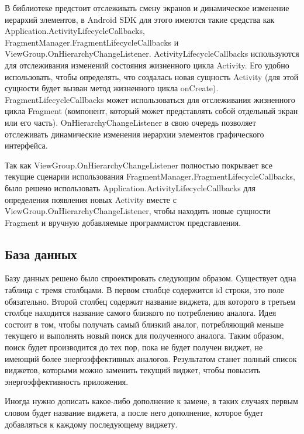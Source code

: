 \documentclass[a4paper,14pt]{extarticle} %
\begin{document}
	В библиотеке предстоит отслеживать смену экранов и динамическое изменение иерархий элементов, в Android SDK для этого имеются такие средства как Application.ActivityLifecycleCallbacks, FragmentManager.FragmentLifecycleCallbacks и ViewGroup.OnHierarchyChangeListener. ActivityLifecycleCallbacks используются для отслеживания изменений состояния жизненного цикла Activity. Его удобно использовать, чтобы определять, что создалась новая сущность Activity (для этой сущности будет вызван метод жизненного цикла onCreate). FragmentLifecycleCallbacks может использоваться для отслеживания жизненного цикла Fragment (компонент, который может представлять собой отдельный экран или его часть). OnHierarchyChangeListener в свою очередь позволяет отслеживать динамические изменения иерархии элементов графического интерфейса.
	
	Так как ViewGroup.OnHierarchyChangeListener полностью покрывает все текущие сценарии использования FragmentManager.FragmentLifecycleCallbacks, было решено использовать Application.ActivityLifecycleCallbacks для определения появления новых Activity вместе с ViewGroup.OnHierarchyChangeListener, чтобы находить новые сущности Fragment и вручную добавляемые программистом представления.
	
	\subsection{База данных}
	
	Базу данных решено было спроектировать следующим образом. Существует одна таблица с тремя столбцами. В первом столбце содержится id строки, это поле обязательно. Второй столбец содержит название виджета, для которого в третьем столбце находится название самого близкого по потреблению аналога. Идея состоит в том, чтобы получать самый близкий аналог, потребляющий меньше текущего и выполнять новый поиск для полученного аналога. Таким образом, поиск будет производится до тех пор, пока не будет получен виджет, не имеющий более энергоэффективных аналогов. Результатом станет полный список виджетов, которыми можно заменить текущий виджет, чтобы повысить энергоэффективность приложения.
	
	Иногда нужно дописать какое-либо дополнение к замене, в таких случаях первым словом будет название виджета, а после него дополнение, которое будет добавляться к каждому последующему виджету.
	
\end{document}
